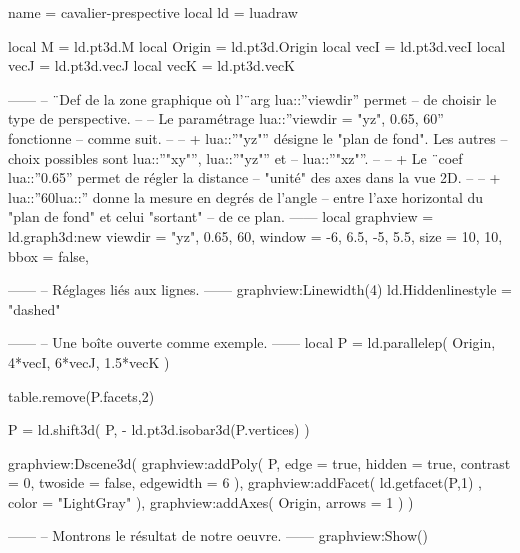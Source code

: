 \documentclass[border = 3pt]{standalone}
\begin{document}
\begin{luadraw*}{name = cavalier-prespective}
local ld = luadraw

local M      = ld.pt3d.M
local Origin = ld.pt3d.Origin
local vecI   = ld.pt3d.vecI
local vecJ   = ld.pt3d.vecJ
local vecK   = ld.pt3d.vecK

------
-- ¨Def de la zone graphique où l'¨arg lua::''viewdir'' permet
-- de choisir le type de perspective.
--
-- Le paramétrage lua::''viewdir = {"yz", 0.65, 60}'' fonctionne
-- comme suit.
--
--     + lua::''"yz"'' désigne le "plan de fond". Les autres
--     choix possibles sont lua::''"xy"'', lua::''"yz"'' et
--     lua::''"xz"''.
--
--     + Le ¨coef lua::''0.65'' permet de régler la distance
--     "unité" des axes dans la vue 2D.
--
--     + lua::''60lua::'' donne la mesure en degrés de l'angle
--     entre l'axe horizontal du "plan de fond" et celui "sortant"
--     de ce plan.
------
local graphview = ld.graph3d:new{
  viewdir = {"yz", 0.65, 60},
  window  = {-6, 6.5, -5, 5.5},
  size    = {10, 10},
  bbox    = false,
}

------
-- Réglages liés aux lignes.
------
graphview:Linewidth(4)
ld.Hiddenlinestyle = "dashed"

------
-- Une boîte ouverte comme exemple.
------
local P = ld.parallelep(
  Origin,
  4*vecI, 6*vecJ, 1.5*vecK
)

table.remove(P.facets,2)

P = ld.shift3d(
  P,
  - ld.pt3d.isobar3d(P.vertices)
)

graphview:Dscene3d(
  graphview:addPoly(
    P,
    {
      edge      = true,
      hidden    = true,
      contrast  = 0,
      twoside   = false,
      edgewidth = 6
    }
  ),
  graphview:addFacet(
    ld.getfacet(P,1) ,
    {color = "LightGray"}
  ),
  graphview:addAxes(
    Origin,
    {arrows = 1}
  )
)

------
-- Montrons le résultat de notre oeuvre.
------
graphview:Show()
\end{luadraw*}
\end{document}
